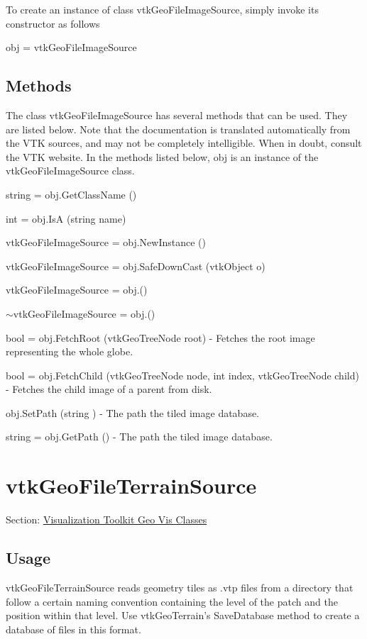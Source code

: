 To create an instance of class vtk\-Geo\-File\-Image\-Source, simply invoke its constructor as follows \begin{DoxyVerb}  obj = vtkGeoFileImageSource
\end{DoxyVerb}
 \hypertarget{vtkwidgets_vtkxyplotwidget_Methods}{}\subsection{Methods}\label{vtkwidgets_vtkxyplotwidget_Methods}
The class vtk\-Geo\-File\-Image\-Source has several methods that can be used. They are listed below. Note that the documentation is translated automatically from the V\-T\-K sources, and may not be completely intelligible. When in doubt, consult the V\-T\-K website. In the methods listed below, {\ttfamily obj} is an instance of the vtk\-Geo\-File\-Image\-Source class. 
\begin{DoxyItemize}
\item {\ttfamily string = obj.\-Get\-Class\-Name ()}  
\item {\ttfamily int = obj.\-Is\-A (string name)}  
\item {\ttfamily vtk\-Geo\-File\-Image\-Source = obj.\-New\-Instance ()}  
\item {\ttfamily vtk\-Geo\-File\-Image\-Source = obj.\-Safe\-Down\-Cast (vtk\-Object o)}  
\item {\ttfamily vtk\-Geo\-File\-Image\-Source = obj.()}  
\item {\ttfamily $\sim$vtk\-Geo\-File\-Image\-Source = obj.()}  
\item {\ttfamily bool = obj.\-Fetch\-Root (vtk\-Geo\-Tree\-Node root)} -\/ Fetches the root image representing the whole globe.  
\item {\ttfamily bool = obj.\-Fetch\-Child (vtk\-Geo\-Tree\-Node node, int index, vtk\-Geo\-Tree\-Node child)} -\/ Fetches the child image of a parent from disk.  
\item {\ttfamily obj.\-Set\-Path (string )} -\/ The path the tiled image database.  
\item {\ttfamily string = obj.\-Get\-Path ()} -\/ The path the tiled image database.  
\end{DoxyItemize}\hypertarget{vtkgeovis_vtkgeofileterrainsource}{}\section{vtk\-Geo\-File\-Terrain\-Source}\label{vtkgeovis_vtkgeofileterrainsource}
Section\-: \hyperlink{sec_vtkgeovis}{Visualization Toolkit Geo Vis Classes} \hypertarget{vtkwidgets_vtkxyplotwidget_Usage}{}\subsection{Usage}\label{vtkwidgets_vtkxyplotwidget_Usage}
vtk\-Geo\-File\-Terrain\-Source reads geometry tiles as .vtp files from a directory that follow a certain naming convention containing the level of the patch and the position within that level. Use vtk\-Geo\-Terrain's Save\-Database method to create a database of files in this format.


